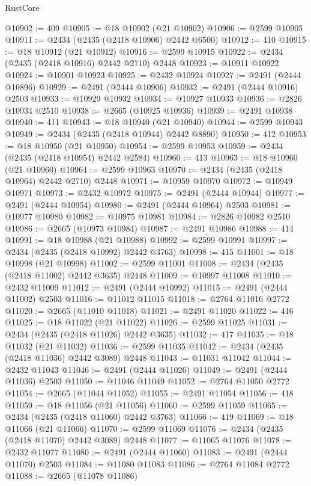 \begin{lexlean}{RustCore}
\begin{coremodule}
@10902 := 409
@10905 := @18 @10902 (@21 @10902)
@10906 := @2599 @10905
@10911 := @2434 (@2435 (@2418 @10906) @2442 @6500)
@10912 := 410
@10915 := @18 @10912 (@21 @10912)
@10916 := @2599 @10915
@10922 := @2434 (@2435 (@2418 @10916) @2442 @2710) @2448
@10923 := @10911 @10922
@10924 := @10901 @10923
@10925 := @2432 @10924
@10927 := @2491 (@2444 @10896)
@10929 := @2491 (@2444 @10906)
@10932 := @2491 (@2444 @10916) @2503
@10933 := @10929 @10932
@10934 := @10927 @10933
@10936 := @2826 @10934 @2510
@10938 := @2665 (@10925 @10936)
@10939 := @2491 @10938
@10940 := 411
@10943 := @18 @10940 (@21 @10940)
@10944 := @2599 @10943
@10949 := @2434 (@2435 (@2418 @10944) @2442 @8890)
@10950 := 412
@10953 := @18 @10950 (@21 @10950)
@10954 := @2599 @10953
@10959 := @2434 (@2435 (@2418 @10954) @2442 @2584)
@10960 := 413
@10963 := @18 @10960 (@21 @10960)
@10964 := @2599 @10963
@10970 := @2434 (@2435 (@2418 @10964) @2442 @2710) @2448
@10971 := @10959 @10970
@10972 := @10949 @10971
@10973 := @2432 @10972
@10975 := @2491 (@2444 @10944)
@10977 := @2491 (@2444 @10954)
@10980 := @2491 (@2444 @10964) @2503
@10981 := @10977 @10980
@10982 := @10975 @10981
@10984 := @2826 @10982 @2510
@10986 := @2665 (@10973 @10984)
@10987 := @2491 @10986
@10988 := 414
@10991 := @18 @10988 (@21 @10988)
@10992 := @2599 @10991
@10997 := @2434 (@2435 (@2418 @10992) @2442 @3763)
@10998 := 415
@11001 := @18 @10998 (@21 @10998)
@11002 := @2599 @11001
@11008 := @2434 (@2435 (@2418 @11002) @2442 @3635) @2448
@11009 := @10997 @11008
@11010 := @2432 @11009
@11012 := @2491 (@2444 @10992)
@11015 := @2491 (@2444 @11002) @2503
@11016 := @11012 @11015
@11018 := @2764 @11016 @2772
@11020 := @2665 (@11010 @11018)
@11021 := @2491 @11020
@11022 := 416
@11025 := @18 @11022 (@21 @11022)
@11026 := @2599 @11025
@11031 := @2434 (@2435 (@2418 @11026) @2442 @3635)
@11032 := 417
@11035 := @18 @11032 (@21 @11032)
@11036 := @2599 @11035
@11042 := @2434 (@2435 (@2418 @11036) @2442 @3089) @2448
@11043 := @11031 @11042
@11044 := @2432 @11043
@11046 := @2491 (@2444 @11026)
@11049 := @2491 (@2444 @11036) @2503
@11050 := @11046 @11049
@11052 := @2764 @11050 @2772
@11054 := @2665 (@11044 @11052)
@11055 := @2491 @11054
@11056 := 418
@11059 := @18 @11056 (@21 @11056)
@11060 := @2599 @11059
@11065 := @2434 (@2435 (@2418 @11060) @2442 @3763)
@11066 := 419
@11069 := @18 @11066 (@21 @11066)
@11070 := @2599 @11069
@11076 := @2434 (@2435 (@2418 @11070) @2442 @3089) @2448
@11077 := @11065 @11076
@11078 := @2432 @11077
@11080 := @2491 (@2444 @11060)
@11083 := @2491 (@2444 @11070) @2503
@11084 := @11080 @11083
@11086 := @2764 @11084 @2772
@11088 := @2665 (@11078 @11086)

\end{coremodule}
\end{lexlean}
